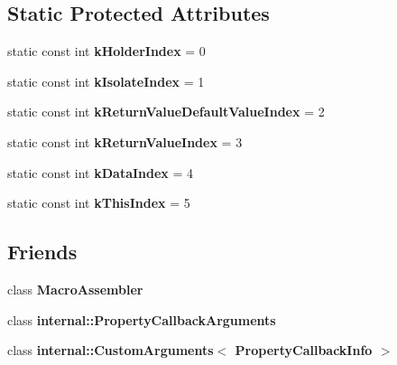 \subsection*{Static Protected Attributes}
\begin{DoxyCompactItemize}
\item 
\hypertarget{classv8_1_1PropertyCallbackInfo_a8598985473483dfadba4e4c67251675b}{}static const int {\bfseries k\+Holder\+Index} = 0\label{classv8_1_1PropertyCallbackInfo_a8598985473483dfadba4e4c67251675b}

\item 
\hypertarget{classv8_1_1PropertyCallbackInfo_a59ba899cb580bc5e8adca6f799db3e2a}{}static const int {\bfseries k\+Isolate\+Index} = 1\label{classv8_1_1PropertyCallbackInfo_a59ba899cb580bc5e8adca6f799db3e2a}

\item 
\hypertarget{classv8_1_1PropertyCallbackInfo_a00849f770023891d1466176f5e0c8539}{}static const int {\bfseries k\+Return\+Value\+Default\+Value\+Index} = 2\label{classv8_1_1PropertyCallbackInfo_a00849f770023891d1466176f5e0c8539}

\item 
\hypertarget{classv8_1_1PropertyCallbackInfo_ae16cdf2c6ce787b21d94953cd514ed0e}{}static const int {\bfseries k\+Return\+Value\+Index} = 3\label{classv8_1_1PropertyCallbackInfo_ae16cdf2c6ce787b21d94953cd514ed0e}

\item 
\hypertarget{classv8_1_1PropertyCallbackInfo_a39fc5d6aaccb2916af503c7120ab99c5}{}static const int {\bfseries k\+Data\+Index} = 4\label{classv8_1_1PropertyCallbackInfo_a39fc5d6aaccb2916af503c7120ab99c5}

\item 
\hypertarget{classv8_1_1PropertyCallbackInfo_a715d28b9c57a581de1698673c9b9eb8a}{}static const int {\bfseries k\+This\+Index} = 5\label{classv8_1_1PropertyCallbackInfo_a715d28b9c57a581de1698673c9b9eb8a}

\end{DoxyCompactItemize}
\subsection*{Friends}
\begin{DoxyCompactItemize}
\item 
\hypertarget{classv8_1_1PropertyCallbackInfo_ae605ff1d9d93250ace8a0a8b8d1dee67}{}class {\bfseries Macro\+Assembler}\label{classv8_1_1PropertyCallbackInfo_ae605ff1d9d93250ace8a0a8b8d1dee67}

\item 
\hypertarget{classv8_1_1PropertyCallbackInfo_a1ba96a1268a72c23f50314cd99c76f1b}{}class {\bfseries internal\+::\+Property\+Callback\+Arguments}\label{classv8_1_1PropertyCallbackInfo_a1ba96a1268a72c23f50314cd99c76f1b}

\item 
\hypertarget{classv8_1_1PropertyCallbackInfo_ad1d1e15ddaed2ab44e8f21c5564881ba}{}class {\bfseries internal\+::\+Custom\+Arguments$<$ Property\+Callback\+Info $>$}\label{classv8_1_1PropertyCallbackInfo_ad1d1e15ddaed2ab44e8f21c5564881ba}

\end{DoxyCompactItemize}


